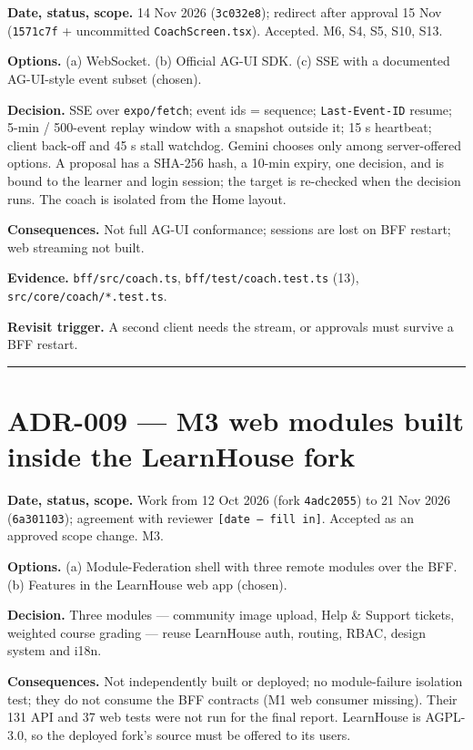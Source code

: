 \documentclass[
  11pt,
]{article}
\begin{document}
\textbf{Date, status, scope.} 14 Nov 2026 (\texttt{3c032e8}); redirect
after approval 15 Nov (\texttt{1571c7f} + uncommitted
\texttt{CoachScreen.tsx}). Accepted. M6, S4, S5, S10, S13.

\textbf{Options.} (a) WebSocket. (b) Official AG-UI SDK. (c) SSE with a
documented AG-UI-style event subset (chosen).

\textbf{Decision.} SSE over \texttt{expo/fetch}; event ids = sequence;
\texttt{Last-Event-ID} resume; 5-min / 500-event replay window with a
snapshot outside it; 15 s heartbeat; client back-off and 45 s stall
watchdog. Gemini chooses only among server-offered options. A proposal
has a SHA-256 hash, a 10-min expiry, one decision, and is bound to the
learner and login session; the target is re-checked when the decision
runs. The coach is isolated from the Home layout.

\textbf{Consequences.} Not full AG-UI conformance; sessions are lost on
BFF restart; web streaming not built.

\textbf{Evidence.} \texttt{bff/src/coach.ts},
\texttt{bff/test/coach.test.ts} (13), \texttt{src/core/coach/*.test.ts}.

\textbf{Revisit trigger.} A second client needs the stream, or approvals
must survive a BFF restart.

\begin{center}\rule{0.5\linewidth}{0.5pt}\end{center}

\hypertarget{adr-009-m3-web-modules-built-inside-the-learnhouse-fork}{%
\section{ADR-009 --- M3 web modules built inside the LearnHouse
fork}\label{adr-009-m3-web-modules-built-inside-the-learnhouse-fork}}

\textbf{Date, status, scope.} Work from 12 Oct 2026 (fork
\texttt{4adc2055}) to 21 Nov 2026 (\texttt{6a301103}); agreement with
reviewer \texttt{{[}date\ —\ fill\ in{]}}. Accepted as an approved scope
change. M3.

\textbf{Options.} (a) Module-Federation shell with three remote modules
over the BFF. (b) Features in the LearnHouse web app (chosen).

\textbf{Decision.} Three modules --- community image upload, Help \&
Support tickets, weighted course grading --- reuse LearnHouse auth,
routing, RBAC, design system and i18n.

\textbf{Consequences.} Not independently built or deployed; no
module-failure isolation test; they do not consume the BFF contracts (M1
web consumer missing). Their 131 API and 37 web tests were not run for
the final report. LearnHouse is AGPL-3.0, so the deployed fork's source
must be offered to its users.
\end{document}
